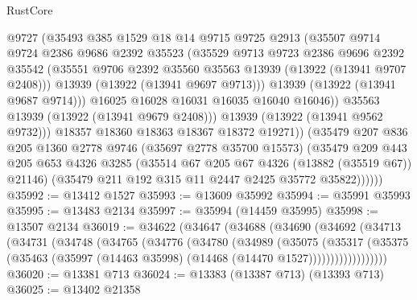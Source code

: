 \begin{lexlean}{RustCore}
\begin{coremodule}
                    @9727
                    (@35493
                      @385
                      @1529
                      @18
                      @14
                      @9715
                      @9725
                      @2913
                      (@35507
                        @9714
                        @9724
                        @2386
                        @9686
                        @2392
                        @35523
                        (@35529
                          @9713
                          @9723
                          @2386
                          @9696
                          @2392
                          @35542
                          (@35551 @9706 @2392 @35560 @35563 @13939 (@13922 (@13941 @9707 @2408)))
                          @13939
                          (@13922 (@13941 @9697 @9713)))
                        @13939
                        (@13922 (@13941 @9687 @9714)))
                      @16025
                      @16028
                      @16031
                      @16035
                      @16040
                      @16046))
                  @35563
                  @13939
                  (@13922 (@13941 @9679 @2408)))
                @13939
                (@13922 (@13941 @9562 @9732)))
              @18357
              @18360
              @18363
              @18367
              @18372
              @19271))
          (@35479
            @207
            @836
            @205
            @1360
            @2778
            @9746
            (@35697 @2778 @35700 @15573)
            (@35479
              @209
              @443
              @205
              @653
              @4326
              @3285
              (@35514 @67 @205 @67 @4326 (@13882 (@35519 @67)) @21146)
              (@35479 @211 @192 @315 @11 @2447 @2425 @35772 @35822))))))
@35992 := @13412 @1527
@35993 := @13609 @35992
@35994 := @35991 @35993
@35995 := @13483 @2134
@35997 := @35994 (@14459 @35995)
@35998 := @13507 @2134
@36019 := @34622
    (@34647
      (@34688
        (@34690
          (@34692
            (@34713
              (@34731
                (@34748
                  (@34765
                    (@34776
                      (@34780
                        (@34989
                          (@35075
                            (@35317
                              (@35375
                                (@35463
                                  (@35997 (@14463 @35998) (@14468 (@14470 @1527))))))))))))))))))
@36020 := @13381 @713
@36024 := @13383 (@13387 @713) (@13393 @713)
@36025 := @13402 @21358

\end{coremodule}
\end{lexlean}
